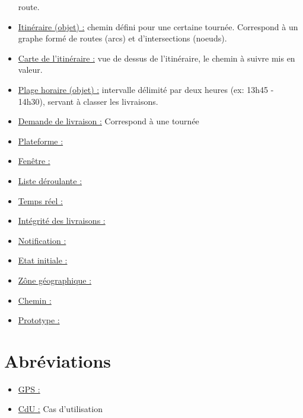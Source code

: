 \documentclass[a4paper]{report}
\begin{document}
\begin{appendices}
\begin{itemize}[label = \textbullet, font = \color{orange}]
            route.
        \item \underline{Itinéraire (objet) :} chemin défini pour une certaine
            tournée. Correspond à un graphe formé de routes (arcs) et
            d’intersections (noeuds).
        \item \underline{Carte de l’itinéraire :} vue de dessus de
            l’itinéraire, le chemin à suivre mis en valeur.
        \item \underline{Plage horaire (objet) :} intervalle délimité par deux
            heures (ex: 13h45 - 14h30), servant à classer les livraisons.
        \item \underline{Demande de livraison :} Correspond à une tournée
        \item \underline{Plateforme :}
        \item \underline{Fenêtre :}
        \item \underline{Liste déroulante :}
        \item \underline{Temps réel :}
        \item \underline{Intégrité des livraisons :}
        \item \underline{Notification :}
        \item \underline{Etat initiale :}
        \item \underline{Zône géographique :}
        \item \underline{Chemin :}
        \item \underline{Prototype :}
    \end{itemize}

    \chapter{Abréviations}
    \begin{itemize}[label = \textbullet, font = \color{orange}]
        \item \underline{GPS :}
        \item \underline{CdU :} Cas d'utilisation
    \end{itemize}
\end{appendices}
\end{document}
